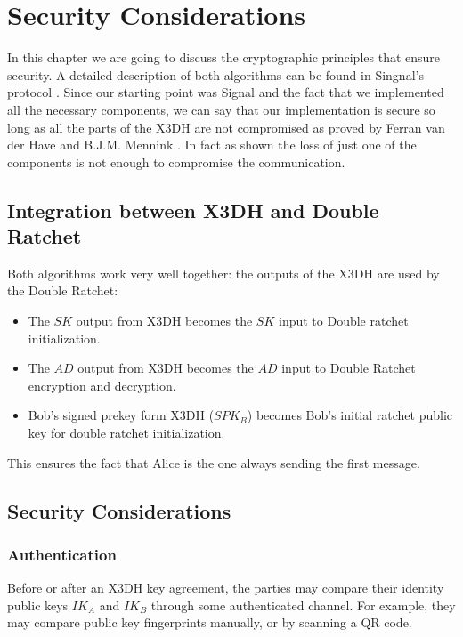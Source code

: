 \chapter{Security Considerations}
\label{cha:Security}

In this chapter we are going to discuss the cryptographic principles that ensure security. A detailed description of both algorithms can be found in Singnal's protocol \cite{x3dh} \cite{DoubleRachet}. Since our starting point was Signal and the fact that we implemented all the necessary components, we can say that our implementation is secure so long as all the parts of the X3DH are not compromised as proved by Ferran van der Have and B.J.M. Mennink \cite{X3DHproof}. In fact as shown the loss of just one of the components is not enough to compromise the communication.

\section{Integration between X3DH and Double Ratchet}
\label{sec:IntegrationWithX3DH}

Both algorithms work very well together: the outputs of the X3DH are used by the Double Ratchet:
\begin{itemize}
  \item The $SK$ output from X3DH becomes the $SK$ input to Double ratchet initialization.
  \item The $AD$ output from X3DH becomes the $AD$ input to Double Ratchet encryption and decryption.
  \item Bob's signed prekey form X3DH ($SPK_B$) becomes Bob's initial ratchet public key for double ratchet initialization.
\end{itemize}

This ensures the fact that Alice is the one always sending the first message.

\section{Security Considerations}
\label{sec:SecurityConsideration}

\subsection{Authentication}
\label{subsec:Authentication}

Before or after an X3DH key agreement, the parties may compare their identity public keys $IK_A$ and $IK_B$ through some authenticated channel. For example, they may compare public key fingerprints manually, or by scanning a QR code.

